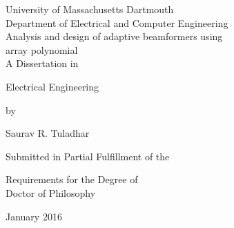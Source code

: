 
\thispagestyle{empty}
\doublespacing
\begin{center}

University of Massachusetts Dartmouth \\
Department of Electrical and Computer Engineering \\


\vspace*{5em}
{\sc Analysis and design of adaptive beamformers using\\ array polynomial} \\

\vspace*{5em}
A Dissertation in 

Electrical Engineering 

by

Saurav R. Tuladhar 

\vspace*{7em}
Submitted in Partial Fulfillment of the 

Requirements for the Degree of \\ Doctor of Philosophy 

\vfill
January 2016

\end{center}
\restoregeometry

